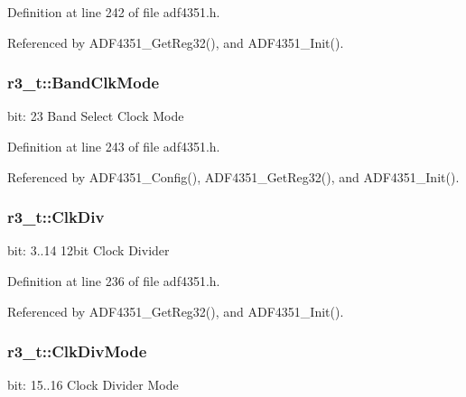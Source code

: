 Definition at line 242 of file adf4351.\+h.



Referenced by A\+D\+F4351\+\_\+\+Get\+Reg32(), and A\+D\+F4351\+\_\+\+Init().

\subsubsection[{\texorpdfstring{Band\+Clk\+Mode}{BandClkMode}}]{ r3\+\_\+t\+::\+Band\+Clk\+Mode}\hypertarget{structr3__t_a47117d4da83d72bd3e84a4f1f9804120}{}\label{structr3__t_a47117d4da83d72bd3e84a4f1f9804120}
bit\+: 23 Band Select Clock Mode 

Definition at line 243 of file adf4351.\+h.



Referenced by A\+D\+F4351\+\_\+\+Config(), A\+D\+F4351\+\_\+\+Get\+Reg32(), and A\+D\+F4351\+\_\+\+Init().

\subsubsection[{\texorpdfstring{Clk\+Div}{ClkDiv}}]{ r3\+\_\+t\+::\+Clk\+Div}\hypertarget{structr3__t_ad53a3132e2a6601f80cb4e455a4dea49}{}\label{structr3__t_ad53a3132e2a6601f80cb4e455a4dea49}
bit\+: 3..14 12bit Clock Divider 

Definition at line 236 of file adf4351.\+h.



Referenced by A\+D\+F4351\+\_\+\+Get\+Reg32(), and A\+D\+F4351\+\_\+\+Init().

\subsubsection[{\texorpdfstring{Clk\+Div\+Mode}{ClkDivMode}}]{ r3\+\_\+t\+::\+Clk\+Div\+Mode}\hypertarget{structr3__t_a29d101adb2cb66623bba16d9783cf752}{}\label{structr3__t_a29d101adb2cb66623bba16d9783cf752}
bit\+: 15..16 Clock Divider Mode 

